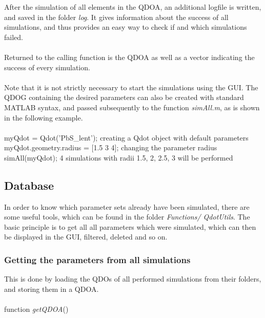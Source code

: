 After the simulation of all elements in the QDOA, an additional logfile is written, and saved in the folder \textit{log}. It gives information about the success of all simulations, and thus provides an easy way to check if and which simulations failed.
\\\\
Returned to the calling function is the QDOA as well as a vector indicating the success of every simulation.
\\\\
Note that it is not strictly necessary to start the simulations using the GUI. The QDOG containing the desired parameters can also be created with standard MATLAB syntax, and passed subsequently to the function \textit{simAll.m}, as is shown in the following example.\\
\\
myQdot = Qdot('PbS\_lent');  creating a Qdot object with default parameters \\
myQdot.geometry.radius = [1.5 3 4]; changing the parameter radius\\
simAll(myQdot);  4 simulations with radii 1.5, 2, 2.5, 3 will be performed\\



\subsection{Database}

In order to know which parameter sets already have been simulated, there are some useful tools, which can be found in the folder \textit{Functions/
QdotUtils}. The basic principle is to get all all parameters which were simulated, which can then be displayed in the GUI, filtered, deleted and so on.

\subsubsection{Getting the parameters from all simulations}
This is done by loading the QDOs of all performed simulations from their folders, and storing them in a QDOA. \\\\
function \textit{getQDOA}()

